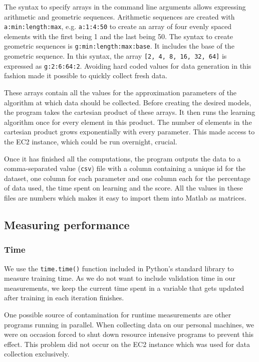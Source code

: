 \documentclass[a4paper,12pt,twoside,openright]{report}
\begin{document}
The syntax to specify arrays in the command line arguments allows expressing arithmetic and geometric sequences. Arithmetic sequences are created with \texttt{a:min:length:max}, e.g. \texttt{a:1:4:50} to create an array of four evenly spaced elements with the first being 1 and the last being 50. The syntax to create geometric sequences is \texttt{g:min:length:max:base}. It includes the base of the geometric sequence. In this syntax, the array \texttt{[2, 4, 8, 16, 32, 64]} is expressed as \texttt{g:2:6:64:2}. Avoiding hard coded values for data generation in this fashion made it possible to quickly collect fresh data.
	
These arrays contain all the values for the approximation parameters of the algorithm at which data should be collected. Before creating the desired models, the program takes the cartesian product of these arrays. It then runs the learning algorithm once for every element in this product. The number of elements in the cartesian product grows exponentially with every parameter. This made access to the EC2 instance, which could be run overnight, crucial.

Once it has finished all the computations, the program outputs the data to a comma-separated value (\texttt{csv}) file with a column containing a unique id for the dataset, one column for each parameter and one column each for the percentage of data used, the time spent on learning and the score. All the values in these files are numbers which makes it easy to import them into Matlab as matrices. 



\subsection{Measuring performance}

\subsubsection{Time}
We use the \texttt{time.time()} function included in Python's standard library to measure training time. As we do not want to include validation time in our measurements, we keep the current time spent in a variable that gets updated after training in each iteration finishes.

One possible source of contamination for runtime measurements are other programs running in parallel. When collecting data on our personal machines, we were on occasion forced to shut down resource intensive programs to prevent this effect. This problem did not occur on the EC2 instance which was used for data collection exclusively.
\end{document}
